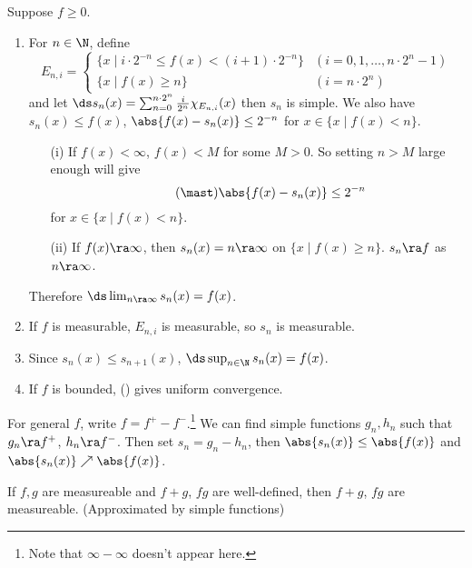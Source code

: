 \pf Suppose \(f \geq 0\).
\begin{enumerate}
    \item For \(n \in \N\), define
          \[
              E_{n, i} = \begin{cases}
                  \{x \mid i\cdot 2^{-n} \leq f(x) < (i+1)\cdot 2^{-n}\} & (i = 0, 1, \dots, n\cdot 2^n - 1) \\
                  \{x \mid f(x) \geq n\}                                 & (i = n\cdot 2^n)
              \end{cases}
          \]
          and let \(\ds s_n(x) = \sum_{n=0}^{n\cdot 2^n} \frac{i}{2^n} \chi_{E_{n, i}} (x)\) then \(s_n\) is simple. We also have \(s_n(x) \leq f(x)\), \(\abs{f(x) - s_n(x)} \leq 2^{-n}\) for \(x \in \{x \mid f(x) < n\}\).
          \begin{enumerate}
              \item[(i)] If \(f(x) < \infty\), \(f(x)< M\) for some \(M > 0\). So setting \(n > M\) large enough will give
                  \[ \tag{\mast}
                      \abs{f(x) - s_n(x)} \leq 2^{-n}
                  \]
                  for \(x \in \{x \mid f(x) < n\}\).
              \item[(ii)] If \(f(x) \ra\infty\), then \(s_n(x) = n \ra \infty\) on \(\{x \mid f(x) \geq n\}\). \(s_n \ra f\) as \(n \ra \infty\).
          \end{enumerate}
          Therefore \(\ds \lim_{n \ra \infty} s_n(x) = f(x)\).

    \item If \(f\) is measurable, \(E_{n, i}\) is measurable, so \(s_n\) is measurable.

    \item Since \(s_n(x) \leq s_{n+1}(x)\), \(\ds \sup_{n\in \N} s_n(x) = f(x)\).

    \item If \(f\) is bounded, (\mast) gives uniform convergence.
\end{enumerate}

For general \(f\), write \(f = f^+ - f^-\).\footnote{Note that \(\infty - \infty\) doesn't appear here.} We can find simple functions \(g_n, h_n\) such that \(g_n \ra f^+\), \(h_n \ra f^-\). Then set \(s_n = g_n - h_n\), then \(\abs{s_n(x)} \leq \abs{f(x)}\) and \(\abs{s_n(x)} \nearrow \abs{f(x)}\).

\cor If \(f, g\) are measureable and \(f + g\), \(fg\) are well-defined, then \(f+g\), \(fg\) are measureable. (Approximated by simple functions)

\pagebreak
